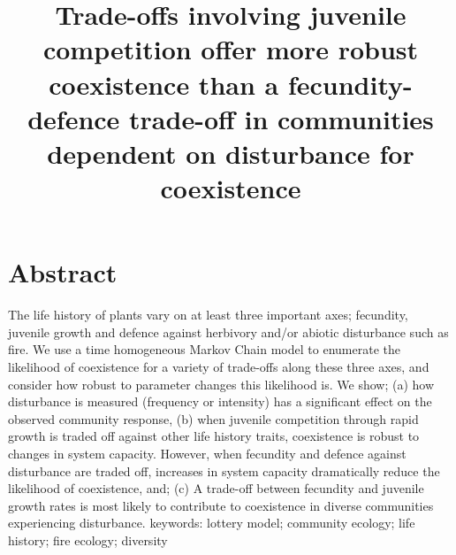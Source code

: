 \documentclass[a4paper]{article}
\begin{document}
\title{Trade-offs involving juvenile competition offer more robust coexistence than a fecundity-defence trade-off in communities dependent on disturbance for coexistence}
\maketitle

\section*{Abstract}
The life history of plants vary on at least three important axes; fecundity, juvenile growth and defence against herbivory and/or abiotic disturbance such as fire. We use a time homogeneous Markov Chain model to enumerate the likelihood of coexistence for a variety of trade-offs along these three axes, and consider how robust to parameter changes this likelihood is. We show; (a) how disturbance is measured (frequency or intensity) has a significant effect on the observed community response, (b) when juvenile competition through rapid growth is traded off against other life history traits, coexistence is robust to changes in system capacity. However, when fecundity and defence against disturbance are traded off, increases in system capacity dramatically reduce the likelihood of coexistence, and; (c) A trade-off between fecundity and juvenile growth rates is most likely to contribute to coexistence in diverse communities experiencing disturbance.
\vspace{0.5cm}
keywords: lottery model; community ecology; life history; fire ecology; diversity
\end{document}
